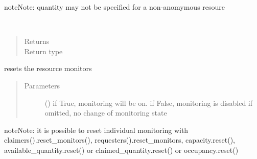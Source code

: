 \documentclass[letterpaper,10pt,english]{sphinxmanual}
\begin{document}
\begin{fulllineitems}
\begin{fulllineitems}
\begin{quote}
\begin{description}
\end{description}\end{quote}

\begin{sphinxadmonition}{note}{Note:}
quantity may not be specified for a non-anomymous resoure
\end{sphinxadmonition}

\end{fulllineitems}


\begin{fulllineitems}
\label{\detokenize{Reference:salabim.Resource.requesters}}~\begin{quote}\begin{description}
\item[{Returns}] \leavevmode
{}

\item[{Return type}] \leavevmode
{\hyperref[\detokenize{Reference:salabim.Queue}]{}}

\end{description}\end{quote}

\end{fulllineitems}


\begin{fulllineitems}
\label{\detokenize{Reference:salabim.Resource.reset_monitors}}
resets the resource monitors
\begin{quote}\begin{description}
\item[{Parameters}] \leavevmode
{} () \textendash{} if True, monitoring will be on. 
if False, monitoring is disabled 
if omitted, no change of monitoring state

\end{description}\end{quote}

\begin{sphinxadmonition}{note}{Note:}
it is possible to reset individual monitoring with
claimers().reset\_monitors(),
requesters().reset\_monitors,
capacity.reset(),
available\_quantity.reset() or
claimed\_quantity.reset() or
occupancy.reset()
\end{sphinxadmonition}


\end{fulllineitems}
\end{fulllineitems}
\end{document}
